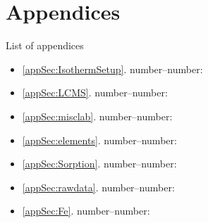 \chapter*{Appendices} %
List of appendices %
\begin{itemize}
    \item \cref{appSec:IsothermSetup}. number--number: 
    \item \cref{appSec:LCMS}. number--number: 
    \item \cref{appSec:misclab}. number--number: 
    \item \cref{appSec:elements}. number--number: 
    \item \cref{appSec:Sorption}. number--number: 
    \item \cref{appSec:rawdata}. number--number: 
    \item \cref{appSec:Fe}. number--number: 
\end{itemize}

%







%
